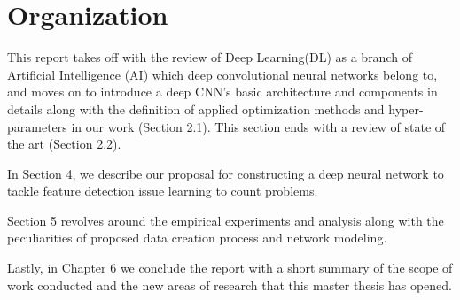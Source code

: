 \section{Organization}

This report takes off with the review of Deep Learning(DL) as a branch of Artificial Intelligence (AI) which deep convolutional neural networks belong to, and moves on to introduce a deep CNN's basic architecture and components in details along with the definition of applied optimization methods and hyper-parameters in our work (Section 2.1). This section ends with a review of state of the art (Section 2.2). 

In Section 4, we describe our proposal for constructing a deep neural network to tackle feature detection issue learning to count problems. 

Section 5 revolves around the empirical experiments and analysis along with the peculiarities of proposed data creation process and network modeling.  

Lastly, in Chapter 6 we conclude the report with a short summary of the scope of work conducted and the new areas of research that this master thesis has opened.